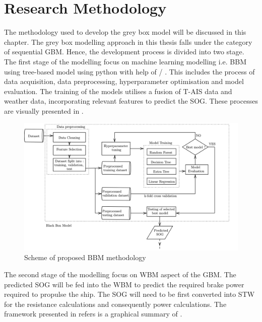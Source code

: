 \chapter{Research Methodology} \label{chp:method}

The methodology used to develop the grey box model will be discussed in this chapter. The grey box modelling approach in this thesis falls under the category of sequential GBM. Hence, the development process is divided into two stage. The first stage of the modelling focus on machine learning modelling i.e. BBM using tree-based model using python with help of \scikit/ . This includes the process of data acquisition, data preprocessing, hyperparameter optimisation and model evaluation. The training of the models utilises a fusion of T-AIS data and weather data, incorporating relevant features to predict the SOG. These processes are visually presented in .\\

\begin{figure}[h]
    \centering
        \includegraphics[width=\textwidth]{02_figures/flowmethod.png}
        \caption{Scheme of proposed BBM methodology}
        \label{fig:flowchart_BBM}
\end{figure}

The second stage of the modelling focus on WBM aspect of the GBM. The predicted SOG will be fed into the WBM to predict the required brake power required to propulse the ship. The SOG will need to be first converted into STW for the resistance calculations and consequently power calculations. The framework presented in  refers is a graphical summary of . 


